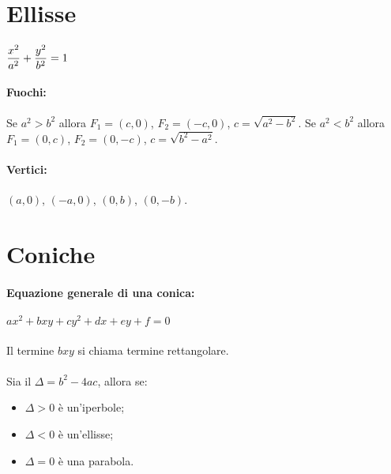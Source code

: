 \documentclass[a4paper]{article}
\begin{document}
        \section*{Ellisse}
                \paragraph{}
                        $ \mathlarger{\frac{x^2}{a^2}} + \mathlarger{\frac{y^2}{b^2}} = 1 $

                \paragraph{Fuochi:}\hfill\newline
                        Se $a^2 > b^2$ allora $F_1 = (c, 0)$, $F_2 = (-c, 0)$, $c = \sqrt{a^2 - b^2}$.\newline
                        Se $a^2 < b^2$ allora $F_1 = (0, c)$, $F_2 = (0, -c)$, $c = \sqrt{b^2 - a^2}$.

                \paragraph{Vertici:}
                        $(a, 0)$, $(-a, 0)$, $(0, b)$, $(0, -b)$.

        \section*{Coniche}
                \paragraph{Equazione generale di una conica:}
                        $ ax^2 + bxy +cy^2 + dx + ey + f = 0 $

                \paragraph{}
                        Il termine $bxy$ si chiama termine rettangolare.

                \paragraph{}
                        Sia il $\Delta = b^2 - 4ac$, allora se:
                        \begin{itemize}
                                \item $\Delta > 0$ \`{e} un'iperbole;
                                \item $\Delta < 0$ \`{e} un'ellisse;
                                \item $\Delta = 0$ \`{e} una parabola.
                        \end{itemize}
\end{document}
